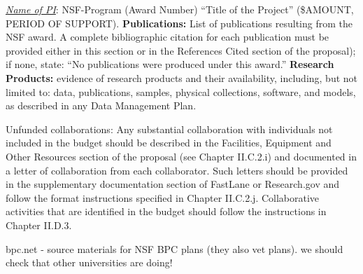 \noindent
\emph{\underline{Name of PI}}: NSF-Program (Award Number) ``Title of the Project'' (\$AMOUNT, PERIOD OF SUPPORT).
{\bf Publications:} List of publications resulting from the NSF award. A complete bibliographic citation for each
publication must be provided either in this section or in the References Cited section of the proposal); if
none, state: ``No publications were produced under this award.'' {\bf Research Products:} evidence of research products
and their availability, including, but not limited to: data, publications, samples, physical collections, software,
and models, as described in any Data Management Plan.

%

\iflater
{}

Unfunded collaborations: Any substantial collaboration with
individuals not included in the budget should be described in the
Facilities, Equipment and Other Resources section of the proposal (see
Chapter II.C.2.i) and documented in a letter of collaboration from
each collaborator. Such letters should be provided in the
supplementary documentation section of FastLane or Research.gov and
follow the format instructions specified in Chapter
II.C.2.j. Collaborative activities that are identified in the budget
should follow the instructions in Chapter II.D.3.  

bpc.net - source materials for NSF BPC plans (they also vet plans).
  we should check that other universities are doing!

\fi
